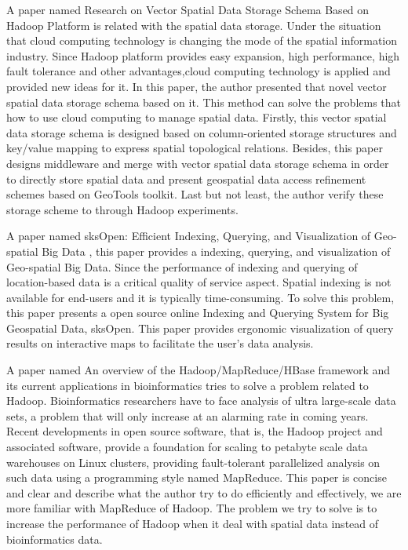 A paper named Research on Vector Spatial Data Storage Schema Based on Hadoop Platform \cite{zheng2013research} is related with the spatial data storage. Under the situation that cloud computing technology is changing the mode of the spatial information industry. Since Hadoop platform provides easy expansion, high performance, high fault tolerance and other advantages,cloud computing technology is applied and provided new ideas for it. In this paper, the author presented that novel vector spatial data storage schema based on it. This method can solve the problems that how to use cloud computing to manage spatial data. Firstly, this vector spatial data storage schema is designed based on column-oriented storage structures and key/value mapping to express spatial topological relations. Besides, this paper designs middleware and merge with vector spatial data storage schema in order to directly store spatial data and present geospatial data access refinement schemes based on GeoTools toolkit. Last but not least, the author verify these storage scheme to through Hadoop experiments.


A paper named sksOpen: Efficient Indexing, Querying, and Visualization of Geo-spatial Big Data \cite{lu2013sksopen}, this paper provides a indexing, querying, and visualization of Geo-spatial Big Data. Since the performance of indexing and querying of location-based data is a critical quality of service aspect. Spatial indexing is not available for end-users and it is typically time-consuming. To solve this problem, this paper presents a open source online Indexing and Querying System for Big Geospatial Data, sksOpen. This paper provides ergonomic visualization of query results on interactive maps to facilitate the user's data analysis.


A paper named An overview of the Hadoop/MapReduce/HBase framework and its current applications in bioinformatics \cite{taylor2010overview} tries to solve a problem related to Hadoop. Bioinformatics researchers have to face analysis of ultra large-scale data sets, a problem that will only increase at an alarming rate in coming years. Recent developments in open source software, that is, the Hadoop project and associated software, provide a foundation for scaling to petabyte scale data warehouses on Linux clusters, providing fault-tolerant parallelized analysis on such data using a programming style named MapReduce. This paper is concise and clear and describe what the author try to do efficiently and effectively, we are more familiar with MapReduce of Hadoop. The problem we try to solve is to increase the performance of Hadoop when it deal with spatial data instead of bioinformatics data. 


